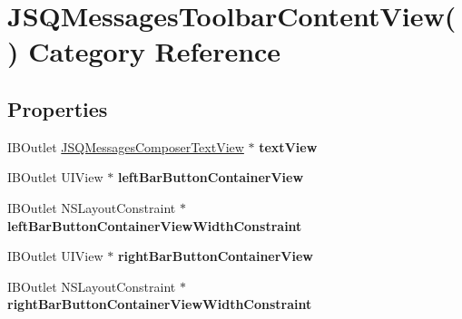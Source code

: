\hypertarget{category_j_s_q_messages_toolbar_content_view_07_08}{}\section{J\+S\+Q\+Messages\+Toolbar\+Content\+View() Category Reference}
\label{category_j_s_q_messages_toolbar_content_view_07_08}
\subsection*{Properties}
\begin{DoxyCompactItemize}
\item 
\hypertarget{category_j_s_q_messages_toolbar_content_view_07_08_ab1ee76faa42aaee3f311a7bb1d28435c}{}I\+B\+Outlet \hyperlink{interface_j_s_q_messages_composer_text_view}{J\+S\+Q\+Messages\+Composer\+Text\+View} $\ast$ {\bfseries text\+View}\label{category_j_s_q_messages_toolbar_content_view_07_08_ab1ee76faa42aaee3f311a7bb1d28435c}

\item 
\hypertarget{category_j_s_q_messages_toolbar_content_view_07_08_a6e3522af31e45c57be43d05be4fbe0b8}{}I\+B\+Outlet U\+I\+View $\ast$ {\bfseries left\+Bar\+Button\+Container\+View}\label{category_j_s_q_messages_toolbar_content_view_07_08_a6e3522af31e45c57be43d05be4fbe0b8}

\item 
\hypertarget{category_j_s_q_messages_toolbar_content_view_07_08_a98dda2c06c85c7d4b3060ef4e7d51aac}{}I\+B\+Outlet N\+S\+Layout\+Constraint $\ast$ {\bfseries left\+Bar\+Button\+Container\+View\+Width\+Constraint}\label{category_j_s_q_messages_toolbar_content_view_07_08_a98dda2c06c85c7d4b3060ef4e7d51aac}

\item 
\hypertarget{category_j_s_q_messages_toolbar_content_view_07_08_a5f68e49364ff40eec0b3cfb890128f9d}{}I\+B\+Outlet U\+I\+View $\ast$ {\bfseries right\+Bar\+Button\+Container\+View}\label{category_j_s_q_messages_toolbar_content_view_07_08_a5f68e49364ff40eec0b3cfb890128f9d}

\item 
\hypertarget{category_j_s_q_messages_toolbar_content_view_07_08_a7a8bb20718e9f65576982a01c88fdab4}{}I\+B\+Outlet N\+S\+Layout\+Constraint $\ast$ {\bfseries right\+Bar\+Button\+Container\+View\+Width\+Constraint}\label{category_j_s_q_messages_toolbar_content_view_07_08_a7a8bb20718e9f65576982a01c88fdab4}


\end{DoxyCompactItemize}
